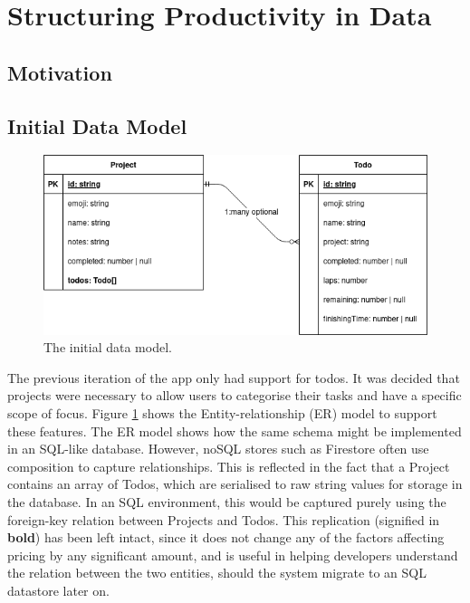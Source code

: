 \section{Structuring Productivity in Data}
\subsection{Motivation}

\subsection{Initial Data Model}
\begin{figure}[h]
    \begin{center}
        \includegraphics[scale=0.5]{images/initial_data_model.png}
    \end{center}
    \caption{The initial data model.}
    \label{fig:initial_data_model}
\end{figure}

The previous iteration of the app only had support for todos. It was decided that projects were necessary to allow users to categorise their tasks and have a specific scope of focus. Figure \ref{fig:initial_data_model} shows the Entity-relationship (ER) model to support these features. The ER model shows how the same schema might be implemented in an SQL-like database. However, noSQL stores such as Firestore often use composition to capture relationships. This is reflected in the fact that a Project contains an array of Todos, which are serialised to raw string values for storage in the database. In an SQL environment, this would be captured purely using the foreign-key relation between Projects and Todos. This replication (signified in \textbf{bold}) has been left intact, since it does not change any of the factors affecting pricing by any significant amount, and is useful in helping developers understand the relation between the two entities, should the system migrate to an SQL datastore later on.

